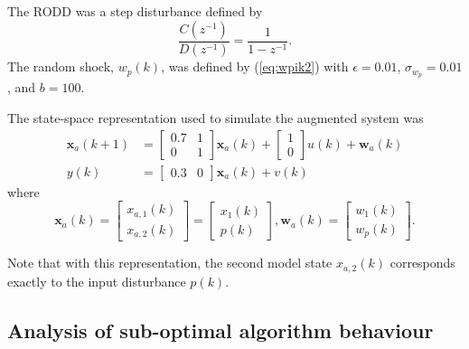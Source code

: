 The RODD was a step disturbance defined by
\begin{equation}
	\frac{C(z^{-1})}{D(z^{-1})} = \frac{1}{1-z^{-1}}.
\end{equation}
The random shock, $w_p(k)$, was defined by (\ref{eq:wpik2}) with $\epsilon=0.01$, $\sigma_{w_p}=0.01$, and $b=100$.

The state-space representation used to simulate the augmented system was
\begin{equation} \label{eq:sim-sys-siso-ss-aug}
	\begin{split}
	\mathbf{x}_{a}(k+1) & =\left[\begin{array}{cc}
		0.7 & 1 \\
		0 & 1
	\end{array}\right] \mathbf{x}_{a}(k)+\left[\begin{array}{l}
		1 \\
		0
	\end{array}\right] u(k) + \mathbf{w}_{a}(k) \\
	y(k) & =\left[\begin{array}{cc}
	0.3 & 0
\end{array}\right] \mathbf{x}_{a}(k) + v(k)
\end{split}
\end{equation}
where
\begin{equation} \label{eq:sim-sys-siso-ss-aug2}
		\mathbf{x}_{a}(k) = \left[\begin{array}{l}
			x_{a,1}(k) \\
			x_{a,2}(k)
		\end{array}\right] = \left[\begin{array}{l}
		x_{1}(k) \\
		p(k)
	\end{array}\right], \mathbf{w}_{a}(k) = \left[\begin{array}{l}
	w_1(k) \\
	w_{p}(k)
\end{array}\right] .
\end{equation}

Note that with this representation, the second model state $x_{a,2}(k)$ corresponds exactly to the input disturbance $p(k)$.

\subsection{Analysis of sub-optimal algorithm behaviour} \label{sim-obs-lin-1-SKF-analysis}

